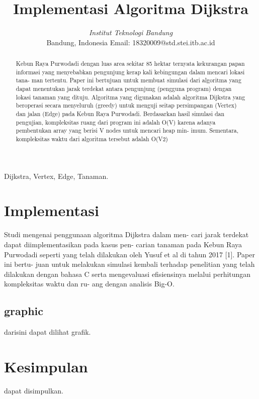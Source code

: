 \documentclass[conference]{IEEEtran}
\title{Implementasi Algoritma Dijkstra}
\author{\IEEEauthorblockN{Fadiah Mumtaz Andevi}
\IEEEauthorblockA{School of Electrical Engineering and Informatics}
\textit{Institut Teknologi Bandung}\\
Bandung, Indonesia
Email: 18320009@std.stei.itb.ac.id}
\begin{document}
\maketitle

\begin{abstract}
    Kebun Raya Purwodadi dengan luas area sekitar 85 hektar ternyata kekurangan papan informasi yang menyebabkan pengunjung kerap kali kebingungan dalam mencari lokasi tana- man tertentu. Paper ini bertujuan untuk membuat simulasi dari algoritma yang dapat menentukan jarak terdekat antara pengunjung (pengguna program) dengan lokasi tanaman yang dituju. Algoritma yang digunakan adalah algoritma Dijkstra yang beroperasi secara menyeluruh (greedy) untuk menguji seitap persimpangan (Vertex) dan jalan (Edge) pada Kebun Raya Purwodadi. Berdasarkan hasil simulasi dan pengujian, kompleksitas ruang dari program ini adalah O(V) karena adanya pembentukan array yang berisi V nodes untuk mencari heap min- imum. Sementara, kompleksitas waktu dari algoritma tersebut adalah O(V2)

\end{abstract}

\begin{IEEEkeywords}
    Dijkstra, Vertex, Edge, Tanaman.
\end{IEEEkeywords}

\section{Implementasi}
Studi mengenai penggunaan algoritma Dijkstra dalam men- cari jarak terdekat dapat diimplementasikan pada kasus pen- carian tanaman pada Kebun Raya Purwodadi seperti yang telah dilakukan oleh Yusuf et al di tahun 2017 [1]. Paper ini bertu- juan untuk melakukan simulasi kembali terhadap penelitian yang telah dilakukan dengan bahasa C serta mengevaluasi efisiensinya melalui perhitungan kompleksitas waktu dan ru- ang dengan analisis Big-O.

\subsection{graphic}
darisini dapat dilihat grafik.

\section{Kesimpulan}
dapat disimpulkan.
\end{document}
